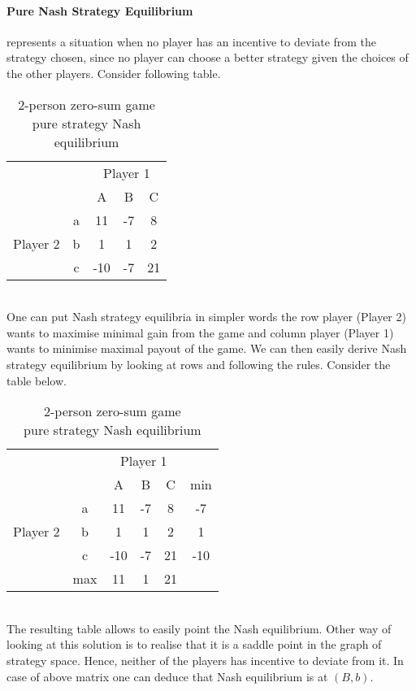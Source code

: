 \documentclass[10pt, a4paper]{report}
\begin{document}
\paragraph{Pure Nash Strategy Equilibrium} represents a situation when no player has an incentive to deviate from the strategy chosen, since no player can choose a better strategy given the choices of the other players. Consider following table.
\begin{table}[ht!]
	\hspace{-4em}
	\centering
	\begin{tabular}{ccccc|}
		& & \multicolumn{3}{c}{Player 1}                                  \\ \cline{3-5}
		& & A & B & \multicolumn{1}{c}{C}                                 \\ \cline{3-5}
		\multirow{3}{*}{Player 2} & \multicolumn{1}{|c|}{a} & 11 & -7 & 8 \\
		& \multicolumn{1}{|c|}{b} & 1 & 1 & 2                             \\
		& \multicolumn{1}{|c|}{c} & -10 & -7 & 21                         \\ \cline{3-5}
	\end{tabular}
	\caption{2-person zero-sum game\\ pure strategy Nash equilibrium}
\end{table}
\\
One can put Nash strategy equilibria in simpler words the row player (Player 2) wants to maximise minimal gain from the game and column player (Player 1) wants to minimise maximal payout of the game. We can then easily derive Nash strategy equilibrium by looking at rows and following the rules. Consider the table below.
\begin{table}[ht!]
	\hspace{-4em}
	\centering
	\begin{tabular}{ccccc|c}
		& & \multicolumn{3}{c}{Player 1} &                                     \\ \cline{3-5}
		& & A & B & \multicolumn{1}{c}{C} & min                                \\ \cline{3-5}
		\multirow{3}{*}{Player 2} & \multicolumn{1}{|c|}{a} & 11 & -7 & 8 & -7 \\
		& \multicolumn{1}{|c|}{b} & 1 & 1 & 2 & 1                              \\
		& \multicolumn{1}{|c|}{c} & -10 & -7 & 21 & -10                        \\ \cline{3-5}
		& max & 11 & 1 & \multicolumn{1}{c}{21} &
	\end{tabular}
	\caption{2-person zero-sum game\\ pure strategy Nash equilibrium}
\end{table}
\\
The resulting table allows to easily point the Nash equilibrium. Other way of looking at this solution is to realise that it is a saddle point in the graph of strategy space. Hence, neither of the players has incentive to deviate from it. In case of above matrix one can deduce that Nash equilibrium is at $(B,b)$.
\end{document}
